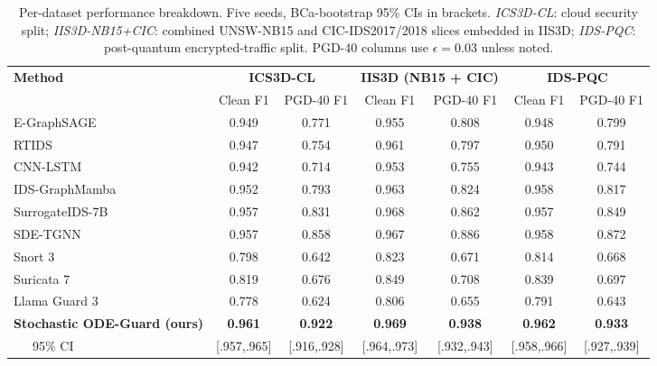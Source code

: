 \documentclass[journal,10pt]{IEEEtran}
\theoremstyle{definition}
\theoremstyle{remark}
\begin{document}
\begin{table}[t]
\caption{Per-dataset performance breakdown. Five seeds, BCa-bootstrap
95\% CIs in brackets. \emph{ICS3D-CL}: cloud security split;
\emph{IIS3D-NB15+CIC}: combined UNSW-NB15 and CIC-IDS2017/2018 slices
embedded in IIS3D; \emph{IDS-PQC}: post-quantum encrypted-traffic
split. PGD-40 columns use $\epsilon{=}0.03$ unless noted.}
\label{tab:per-dataset}
\centering
\small
\setlength{\tabcolsep}{6pt}
\begin{tabular}{@{}lcccccc@{}}
\toprule
\textbf{Method} & \multicolumn{2}{c}{\textbf{ICS3D-CL}} & \multicolumn{2}{c}{\textbf{IIS3D (NB15 + CIC)}} & \multicolumn{2}{c}{\textbf{IDS-PQC}} \\
\cmidrule(lr){2-3}\cmidrule(lr){4-5}\cmidrule(lr){6-7}
                & Clean F1 & PGD-40 F1 & Clean F1 & PGD-40 F1 & Clean F1 & PGD-40 F1 \\
\midrule
E-GraphSAGE~\cite{lo2022egraphsage}    & 0.949 & 0.771 & 0.955 & 0.808 & 0.948 & 0.799 \\
RTIDS~\cite{wu2022rtids}               & 0.947 & 0.754 & 0.961 & 0.797 & 0.950 & 0.791 \\
CNN-LSTM~\cite{halbouni2022cnnlstm}    & 0.942 & 0.714 & 0.953 & 0.755 & 0.943 & 0.744 \\
IDS-GraphMamba~\cite{mosaiyebzadeh2025graphmamba} & 0.952 & 0.793 & 0.963 & 0.824 & 0.958 & 0.817 \\
SurrogateIDS-7B~\cite{robustidps_repo} & 0.957 & 0.831 & 0.968 & 0.862 & 0.957 & 0.849 \\
SDE-TGNN~\cite{robustidps_repo}        & 0.957 & 0.858 & 0.967 & 0.886 & 0.958 & 0.872 \\
Snort 3~\cite{snort3}                  & 0.798 & 0.642 & 0.823 & 0.671 & 0.814 & 0.668 \\
Suricata 7~\cite{suricata7}            & 0.819 & 0.676 & 0.849 & 0.708 & 0.839 & 0.697 \\
Llama Guard 3~\cite{llamaguard3}       & 0.778 & 0.624 & 0.806 & 0.655 & 0.791 & 0.643 \\
\midrule
\textbf{Stochastic ODE-Guard (ours)}   & \textbf{0.961} & \textbf{0.922} & \textbf{0.969} & \textbf{0.938} & \textbf{0.962} & \textbf{0.933}\\
~~~95\% CI                              & {\scriptsize[.957,.965]} & {\scriptsize[.916,.928]} & {\scriptsize[.964,.973]} & {\scriptsize[.932,.943]} & {\scriptsize[.958,.966]} & {\scriptsize[.927,.939]} \\
\bottomrule
\end{tabular}
\end{table}
\end{document}
